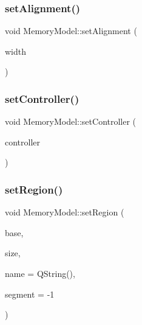 \subsubsection{\texorpdfstring{set\+Alignment()}{setAlignment()}}
{\footnotesize\ttfamily void Memory\+Model\+::set\+Alignment (\begin{DoxyParamCaption}\item[{\mbox{\hyperlink{ioapi_8h_a787fa3cf048117ba7123753c1e74fcd6}{int}}}]{width }\end{DoxyParamCaption})}

\mbox{\label{class_q_g_b_a_1_1_memory_model_acb6e5426f51a6a96e2861d2faef7bbfb}} 
\subsubsection{\texorpdfstring{set\+Controller()}{setController()}}
{\footnotesize\ttfamily void Memory\+Model\+::set\+Controller (\begin{DoxyParamCaption}\item[{std\+::shared\+\_\+ptr$<$ \mbox{\hyperlink{class_q_g_b_a_1_1_core_controller}{Core\+Controller}} $>$}]{controller }\end{DoxyParamCaption})}

\mbox{\label{class_q_g_b_a_1_1_memory_model_ab88fae3068abbdbb73095cbb5ef7fc79}} 
\subsubsection{\texorpdfstring{set\+Region()}{setRegion()}}
{\footnotesize\ttfamily void Memory\+Model\+::set\+Region (\begin{DoxyParamCaption}\item[{uint32\+\_\+t}]{base,  }\item[{uint32\+\_\+t}]{size,  }\item[{const Q\+String \&}]{name = {\ttfamily QString()},  }\item[{\mbox{\hyperlink{ioapi_8h_a787fa3cf048117ba7123753c1e74fcd6}{int}}}]{segment = {\ttfamily -\/1} }\end{DoxyParamCaption})}

